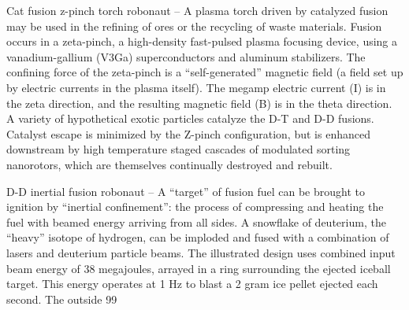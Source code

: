 \documentclass[a4paper]{book}
\begin{document}
Cat fusion z-pinch torch robonaut – A plasma torch driven by catalyzed fusion may be used in the refining of ores or the recycling of waste materials.  Fusion occurs in a zeta-pinch, a high-density fast-pulsed plasma focusing device, using a vanadium-gallium (V3Ga) superconductors and aluminum stabilizers.  The confining force of the zeta-pinch is a “self-generated” magnetic field (a field set up by electric currents in the plasma itself).  The megamp electric current (I) is in the zeta direction, and the resulting magnetic field (B) is in the theta direction.  A variety of hypothetical exotic particles catalyze the D-T and D-D fusions. Catalyst escape is minimized by the Z-pinch configuration, but is enhanced downstream by high temperature staged cascades of modulated sorting nanorotors, which are themselves continually destroyed and rebuilt.
 
D-D inertial fusion robonaut – A “target” of fusion fuel can be brought to ignition by “inertial confinement”: the process of compressing and heating the fuel with beamed energy arriving from all sides.  A snowflake of deuterium, the “heavy” isotope of hydrogen, can be imploded and fused with a combination of lasers and deuterium particle beams.  The illustrated design uses combined input beam energy of 38 megajoules, arrayed in a ring surrounding the ejected iceball target.  This energy operates at 1 Hz to blast a 2 gram ice pellet ejected each second. The outside 99%
 
\end{document}
